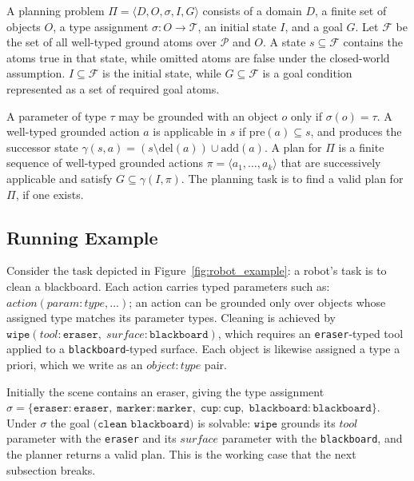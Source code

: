 A planning problem $\Pi = \langle D, O, \sigma, I, G \rangle$ consists of a domain $D$, a finite set of objects $O$, a type assignment $\sigma : O \rightarrow \mathcal{T}$, an initial state $I$, and a goal $G$. Let $\mathcal{F}$ be the set of all well-typed ground atoms over $\mathcal{P}$ and $O$. A state $s \subseteq \mathcal{F}$ contains the atoms true in that state, while omitted atoms are false under the closed-world assumption. $I \subseteq \mathcal{F}$ is the initial state, while \(G \subseteq \mathcal{F}\) is a goal condition represented as a set of required goal atoms.

A parameter of type $\tau$ may be grounded with an object $o$ only if $\sigma(o) = \tau$. A well-typed grounded action $a$ is applicable in $s$ if $\mathrm{pre}(a) \subseteq s$, and produces the successor state $\gamma(s,a) = (s \setminus \mathrm{del}(a)) \cup \mathrm{add}(a)$. A plan for $\Pi$ is a finite sequence of well-typed grounded actions $\pi = \langle a_1,\ldots,a_k\rangle$ that are successively applicable and satisfy $G \subseteq \gamma(I,\pi)$. The planning task is to find a valid plan for \(\Pi\), if one exists.

\label{sec:preliminaries}

\subsection{Running Example}
Consider the task depicted in Figure~\ref{fig:robot_example}: a robot's task is to clean a blackboard. Each action carries typed parameters such as: $\mathit{action}(\mathit{param}\!:\!\mathit{type}, ...)$; an action can be grounded only over objects whose assigned type matches its parameter types. Cleaning is achieved by $\mathtt{wipe}(\mathit{tool}\!:\!\texttt{eraser},\; \mathit{surface}\!:\!\texttt{blackboard})$, which requires an \texttt{eraser}-typed tool applied to a \texttt{blackboard}-typed surface. Each object is likewise assigned a type a priori, which we write as an $\mathit{object}\!:\!\mathit{type}$ pair.

Initially the scene contains an eraser, giving the type assignment $\sigma = \{\mathtt{eraser}\!:\!\texttt{eraser},\allowbreak\; \mathtt{marker}\!:\!\texttt{marker},\allowbreak\; \mathtt{cup}\!:\!\texttt{cup},\allowbreak\; \mathtt{blackboard}\!:\!\texttt{blackboard}\}$. Under $\sigma$ the goal $\texttt{(clean blackboard)}$ is solvable: $\mathtt{wipe}$ grounds its $\mathit{tool}$ parameter with the \texttt{eraser} and its $\mathit{surface}$ parameter with the \texttt{blackboard}, and the planner returns a valid plan. This is the working case that the next subsection breaks.
 

